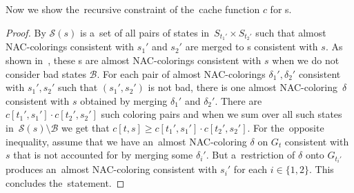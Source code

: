 Now we show the~recursive constraint of the~cache function \( c \) for \JoinNode{}s.
%
%
%
\begin{proof}
	By 
	\( \mathcal{S}(s) \) is a~set of
	all pairs of states in~\( S_{t_1'} \times S_{t_2'} \)
	such that almost NAC-colorings consistent with \( s_1' \) and \( s_2' \)
	are merged to \rbcol{}s consistent with \( s \).
	As shown in~,
	these \rbcol{}s are almost NAC-colorings consistent with \( s \)
	when we do not consider bad states \( \mathcal{B} \).
	For each pair of almost NAC-colorings \( \delta_1', \delta_2' \)
	consistent with \( s_1', s_2' \) such that \( (s_1', s_2') \) is not bad,
	there is one almost NAC-coloring~\( \delta \) consistent with \( s \)
	obtained by merging \( \delta_1' \) and \( \delta_2' \).
	There are \( c[t_1', s_1'] \cdot c[t_2', s_2'] \) such coloring pairs and
	when we sum over all such states in~\( \mathcal{S}(s) \setminus \mathcal{B} \)
	we get that \( c[t, s] \ge c[t_1', s_1'] \cdot c[t_2', s_2'] \).
	For the~opposite inequality, assume that we have
	an~almost NAC-coloring \( \delta \) on \( G_t \) consistent with \( s \)
	that is not accounted for by merging some \( \delta_i' \).
	But a~restriction of \( \delta \) onto \( G_{t_i'} \) produces an~almost NAC-coloring
	consistent with \( s_i' \) for each \( i \in \{1,2\} \).
	This concludes the~statement.
\end{proof}
%


